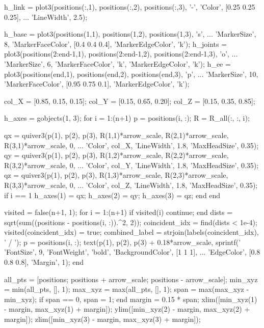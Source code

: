 \documentclass[11pt, a4paper]{article}
\begin{document}
\begin{matlabcode}
h_link = plot3(positions(:,1), positions(:,2), positions(:,3), '-', 'Color', [0.25 0.25 0.25], ...
    'LineWidth', 2.5);

h_base = plot3(positions(1,1), positions(1,2), positions(1,3), 's', ...
    'MarkerSize', 8, 'MarkerFaceColor', [0.4 0.4 0.4], 'MarkerEdgeColor', 'k');
h_joints = plot3(positions(2:end-1,1), positions(2:end-1,2), positions(2:end-1,3), 'o', ...
    'MarkerSize', 6, 'MarkerFaceColor', 'k', 'MarkerEdgeColor', 'k');
h_ee = plot3(positions(end,1), positions(end,2), positions(end,3), 'p', ...
    'MarkerSize', 10, 'MarkerFaceColor', [0.95 0.75 0.1], 'MarkerEdgeColor', 'k');

col_X = [0.85, 0.15, 0.15];
col_Y = [0.15, 0.65, 0.20];
col_Z = [0.15, 0.35, 0.85];

h_axes = gobjects(1, 3);
for i = 1:(n+1)
    p = positions(i, :);
    R = R_all(:, :, i);

    qx = quiver3(p(1), p(2), p(3), R(1,1)*arrow_scale, R(2,1)*arrow_scale, R(3,1)*arrow_scale, 0, ...
        'Color', col_X, 'LineWidth', 1.8, 'MaxHeadSize', 0.35);
    qy = quiver3(p(1), p(2), p(3), R(1,2)*arrow_scale, R(2,2)*arrow_scale, R(3,2)*arrow_scale, 0, ...
        'Color', col_Y, 'LineWidth', 1.8, 'MaxHeadSize', 0.35);
    qz = quiver3(p(1), p(2), p(3), R(1,3)*arrow_scale, R(2,3)*arrow_scale, R(3,3)*arrow_scale, 0, ...
        'Color', col_Z, 'LineWidth', 1.8, 'MaxHeadSize', 0.35);
    if i == 1
        h_axes(1) = qx;
        h_axes(2) = qy;
        h_axes(3) = qz;
    end
end

visited = false(n+1, 1);
for i = 1:(n+1)
    if visited(i)
        continue;
    end
    dists = sqrt(sum((positions - positions(i, :)).^2, 2));
    coincident_idx = find(dists < 1e-4);
    visited(coincident_idx) = true;
    combined_label = strjoin(labels(coincident_idx), ' / ');
    p = positions(i, :);
    text(p(1), p(2), p(3) + 0.18*arrow_scale, sprintf(' %
        'FontSize', 9, 'FontWeight', 'bold', 'BackgroundColor', [1 1 1], ...
        'EdgeColor', [0.8 0.8 0.8], 'Margin', 1);
end

all_pts = [positions; positions + arrow_scale; positions - arrow_scale];
min_xyz = min(all_pts, [], 1);
max_xyz = max(all_pts, [], 1);
span = max(max_xyz - min_xyz);
if span == 0, span = 1; end
margin = 0.15 * span;
xlim([min_xyz(1) - margin, max_xyz(1) + margin]);
ylim([min_xyz(2) - margin, max_xyz(2) + margin]);
zlim([min_xyz(3) - margin, max_xyz(3) + margin]);
\end{matlabcode}
\end{document}
